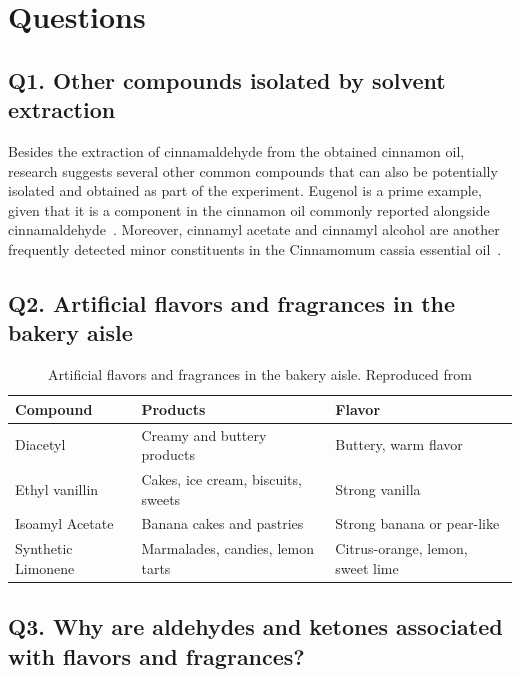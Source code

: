\documentclass[
  10pt,
  twocolumn,
  letterpaper,
]{article}
\begin{document}
\section{Questions}

\subsection{Q1. Other compounds isolated by solvent extraction}

Besides the extraction of cinnamaldehyde from the obtained cinnamon oil, research suggests several other common compounds that can also be potentially isolated and obtained as part of the experiment. Eugenol is a prime example, given that it is a component in the cinnamon oil commonly reported alongside cinnamaldehyde~\cite{utchariyakiat2016_antimicrobial}. Moreover, cinnamyl acetate and cinnamyl alcohol are another frequently detected minor constituents in the Cinnamomum cassia essential oil~\cite{daddabbo2025_nematicidal}.

\subsection{Q2. Artificial flavors and fragrances in the bakery aisle}

\begin{table}[H]
  \centering
  \caption{Artificial flavors and fragrances in the bakery aisle. Reproduced from \cite{singh2023_natural_food_flavours}}
  \label{tab:bakery_flavors}
  \begin{tabular}{@{}p{}p{}p{}@{}}
    \toprule
    \textbf{Compound} & \textbf{Products} & \textbf{Flavor} \\
    \midrule
    Diacetyl & Creamy and buttery products & Buttery, warm flavor\\
    Ethyl vanillin & Cakes, ice cream, biscuits, sweets& Strong vanilla\\
    Isoamyl Acetate&Banana cakes and pastries&Strong banana or pear-like \\
    Synthetic Limonene&Marmalades, candies, lemon tarts& Citrus-orange, lemon, sweet lime\\
    \bottomrule
  \end{tabular}
\end{table}

\subsection{Q3. Why are aldehydes and ketones associated with flavors and fragrances?}
\end{document}
